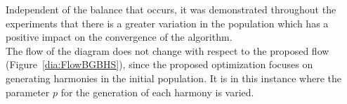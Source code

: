 Independent of the balance that occurs, it was demonstrated throughout the experiments that there is a greater variation in the population which has a positive impact on the convergence of the algorithm.\\

The flow of the diagram does not change with respect to the proposed flow (Figure~\ref{dia:FlowBGBHS}), since the proposed optimization focuses on generating harmonies in the initial population. It is in this instance where the parameter $ p $ for the generation of each harmony is varied.
